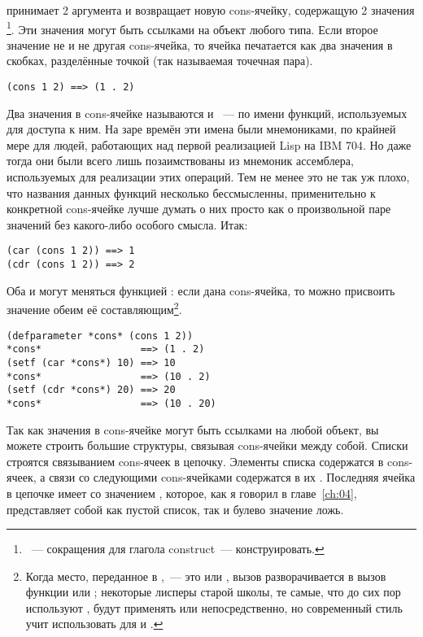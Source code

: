  принимает 2 аргумента и возвращает новую cons-ячейку, содержащую 2 значения
\footnote{~--- сокращения для глагола construct~--- конструировать.}. Эти значения
могут быть ссылками на объект любого типа. Если второе значение не  и не другая
cons-ячейка, то ячейка печатается как два значения в скобках, разделённые точкой (так
называемая точечная пара).

\begin{lstlisting}
(cons 1 2) ==> (1 . 2)
\end{lstlisting}

Два значения в cons-ячейке называются  и ~--- по имени функций,
используемых для доступа к ним. На заре времён эти имена были мнемониками, по крайней мере
для людей, работающих над первой реализацией Lisp на IBM 704. Но даже тогда они были всего
лишь позаимствованы из мнемоник ассемблера, используемых для реализации этих операций. Тем
не менее это не так уж плохо, что названия данных функций несколько бессмысленны,
применительно к конкретной cons-ячейке лучше думать о них просто как о произвольной паре
значений без какого-либо особого смысла. Итак:

\begin{lstlisting}
(car (cons 1 2)) ==> 1
(cdr (cons 1 2)) ==> 2
\end{lstlisting}

Оба  и  могут меняться функцией : если дана cons-ячейка, то
можно присвоить значение обеим её составляющим\footnote{Когда место, переданное в
  ,~--- это  или , вызов  разворачивается в вызов
  функции  или ; некоторые лисперы старой школы, те самые, что
  до сих пор используют , будут применять  или 
  непосредственно, но современный стиль учит использовать  для  и
  .}.

\begin{lstlisting}
(defparameter *cons* (cons 1 2))
*cons*                 ==> (1 . 2)
(setf (car *cons*) 10) ==> 10
*cons*                 ==> (10 . 2)
(setf (cdr *cons*) 20) ==> 20
*cons*                 ==> (10 . 20)
\end{lstlisting}

Так как значения в cons-ячейке могут быть ссылками на любой объект, вы можете строить большие
структуры, связывая cons-ячейки между собой. Списки строятся связыванием cons-ячеек в
цепочку. Элементы списка содержатся в  cons-ячеек, а связи со следующими
cons-ячейками содержатся в их . Последняя ячейка в цепочке имеет  со
значением , которое, как я говорил в главе~\ref{ch:04}, представляет собой как
пустой список, так и булево значение ложь.

